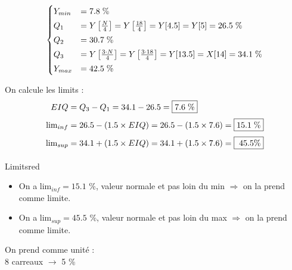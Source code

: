 \documentclass{article}
\begin{document}
\begin{enumerate}
\[
    \begin{cases}
        Y_{min} &= 7.8 \hspace{0.1cm} \% \\[0.1cm] 
        Q_1 &= Y\left[\frac{N}{4}\right]  = Y\left[\frac{18}{4}\right]=Y[4.5]=Y[5]= 26.5\hspace{0.1cm}  \%  \\[0.1cm]
        Q_2 &= 30.7\hspace{0.1cm}  \% \\[0.1cm]
        Q_3 &= Y\left[\frac{3\cdot N}{4}\right]  = Y\left[\frac{3\cdot 18}{4}\right]=Y[13.5]=X[14]= 34.1 \hspace{0.1cm}  \%  \\[0.1cm]
        Y_{max} &= 42.5\hspace{0.1cm}  \%  
    \end{cases}
    \]

On calcule les limits :
\begin{align*}
    EIQ &= Q_3 - Q_1 = 34.1 - 26.5 = \boxed{7.6\hspace{0.1cm}\%}\\[0.1cm]
    \text{lim}_{inf} &= 26.5 - (1.5 \times EIQ) = 26.5 - (1.5 \times 7.6) = \boxed{15.1\hspace{0.1cm}\%}\\[0.1cm]
    \text{lim}_{sup} &= 34.1 + (1.5 \times EIQ) = 34.1 + (1.5 \times 7.6) = \boxed{\hspace{0.1cm}45.5\%}\\[0.1cm]
\end{align*}


\vspace{0.15cm}

\begin{prettyBox}{Limits}{red}

\begin{itemize}
    \item On a \(\text{lim}_{inf} = 15.1 \) \%, valeur normale et pas loin du min \(\Rightarrow\) on la prend comme limite.
    \item On a \(\text{lim}_{sup} = 45.5\) \%, valeur normale et pas loin du max \(\Rightarrow\) on la prend comme limite.
\end{itemize}
\end{prettyBox}

\newpage

On prend comme unité :\\[0.1cm]
8 carreaux \( \rightarrow \) 5 \%


\vspace{0.25cm}


\end{enumerate}
\end{document}
